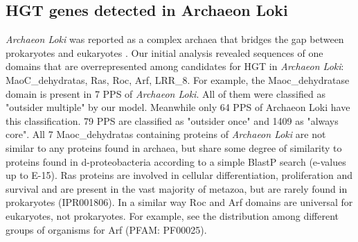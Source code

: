 \subsection{HGT genes detected in Archaeon Loki}
\textit{Archaeon Loki} was reported as a complex archaea that bridges the gap
between prokaryotes and eukaryotes \cite{Spang2015}. Our initial analysis
revealed sequences of one domains that are overrepresented among candidates for
HGT in \textit{Archaeon Loki}: MaoC\_dehydratas, Ras, Roc, Arf, LRR\_8. For
example, the Maoc\_dehydratase domain is present in 7 PPS of \textit{Archaeon
Loki}. All of them were classified as "outsider multiple" by our model.
Meanwhile only 64 PPS of Archaeon Loki have this classification. 79 PPS are
classified as "outsider once" and 1409 as "always core". All 7 Maoc\_dehydratas
containing proteins of \textit{Archaeon Loki} are not similar to any proteins
found in archaea, but share some degree of similarity to proteins found in
d-proteobacteria according to a simple BlastP search (e-values up to E-15).
Ras proteins are involved in cellular differentiation, proliferation and
survival and are present in the vast majority of metazoa, but are rarely found
in prokaryotes (IPR001806). In a similar way Roc and Arf domains are universal
for eukaryotes, not prokaryotes. For example, see the distribution among
different groups of organisms for Arf (PFAM: PF00025).
